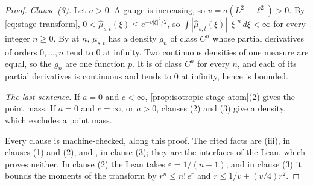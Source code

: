 \begin{proof}
\emph{Clause (3).} Let $a > 0$. A gauge is increasing, so $v = a(L^2 - \ell^2) > 0$. By
\ref{eq:stage-transform}, $0 < \widehat\mu_{s,t}(\xi) \le e^{-v|\xi|^2/2}$, so
$\int|\widehat\mu_{s,t}(\xi)|\,|\xi|^n\,d\xi < \infty$ for every integer $n \ge 0$. By 
at $n$, $\mu_{s,t}$ has a density $g_n$ of class $C^n$ whose partial derivatives of orders
$0,\dots,n$ tend to $0$ at infinity. Two continuous densities of one measure are equal, so the
$g_n$ are one function $p$. It is of class $C^n$ for every $n$, and each of its partial
derivatives is continuous and tends to $0$ at infinity, hence is bounded.

\emph{The last sentence.} If $a = 0$ and $c < \infty$, \ref{prop:isotropic-stage-atom}(2) gives
the point mass. If $a = 0$ and $c = \infty$, or $a > 0$, clauses (2) and (3) give a density,
which excludes a point mass.

Every clause is machine-checked, along this proof. The cited facts are (iii), in
clauses (1) and (2), and , in clause (3); they are the interfaces of the Lean, which
proves neither. In clause (2) the Lean takes $\varepsilon = 1/(n+1)$, and in clause (3) it bounds
the moments of the transform by $r^n \le n!\,e^r$ and $r \le 1/v + (v/4)r^2$.
\end{proof}


